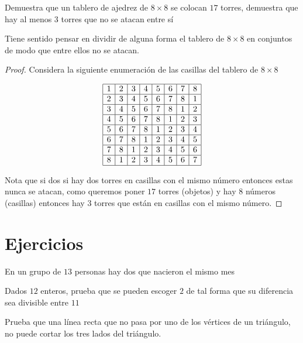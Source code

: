 \documentclass[11pt]{scrartcl}
\begin{document}
\begin{example}
    Demuestra que un tablero de ajedrez de $8\times 8$ se colocan $17$ torres, demuestra que hay al menos $3$ torres que no se atacan entre sí
\end{example}
Tiene sentido pensar en dividir de alguna forma el tablero de $8\times 8$ en conjuntos de modo que entre ellos no se atacan.
\begin{proof}
    Considera la siguiente enumeración de las casillas del tablero de $8\times 8$
    \begin{center}
        $$\begin{array}{|c|c|c|c|c|c|c|c|} \hline
1&2&3&4&5&6&7&8\\ \hline
2&3&4&5&6&7&8&1\\ \hline
3&4&5&6&7&8&1&2\\ \hline
4&5&6&7&8&1&2&3\\ \hline
5&6&7&8&1&2&3&4\\ \hline
6&7&8&1&2&3&4&5\\ \hline
7&8&1&2&3&4&5&6\\ \hline
8&1&2&3&4&5&6&7\\ \hline
\end{array}$$
    \end{center}
    Nota que si dos si hay dos torres en casillas con el mismo número entonces estas nunca se atacan, como queremos poner $17$ torres (objetos) y hay $8$ números (casillas) entonces hay $3$ torres que están en casillas con el mismo número.
\end{proof}

\section{Ejercicios}
\begin{exercise}
    En un grupo de $13$ personas hay dos que nacieron el mismo mes
\end{exercise}
\begin{exercise}
    Dados $12$ enteros, prueba que se pueden escoger $2$ de tal forma que su diferencia sea divisible entre $11$
\end{exercise}
\begin{exercise}
    Prueba que una línea recta que no pasa por uno de los vértices de un triángulo, no puede cortar los tres lados del triángulo.
\end{exercise}
\begin{exercise}
    
\end{exercise}
\end{document}

